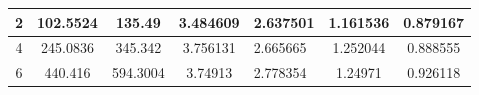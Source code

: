 \begin{table}
{\begin{tabular}{|c|c|c|c|l|c|c|}
2                                                                             & 102.5524                                                                                                                                                                                                                       & 135.49                                                                                                                                                                                                                       & 3.484609                                                                                                                        & 2.637501                                                                                                                                              & 1.161536                                                                                   & 0.879167                                                                                   \\ \hline
4                                                                             & 245.0836                                                                                                                                                                                                                       & 345.342                                                                                                                                                                                                                      & 3.756131                                                                                                                        & 2.665665                                                                                                                                              & 1.252044                                                                                   & 0.888555                                                                                   \\ \hline
6                                                                             & 440.416                                                                                                                                                                                                                        & 594.3004                                                                                                                                                                                                                     & 3.74913                                                                                                                         & 2.778354                                                                                                                                              & 1.24971                                                                                    & 0.926118                                                                                   \\ \hline

\end{tabular}}
\end{table}
